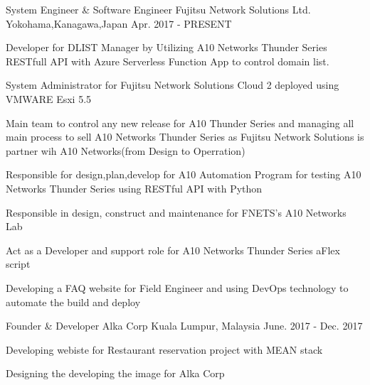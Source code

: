 

\begin{cventries}

  \cventry
	{System Engineer \& Software Engineer} %
    {Fujitsu Network Solutions Ltd. } %
    {Yokohama,Kanagawa,Japan} %
    {Apr. 2017 - PRESENT} %
    {
      \begin{cvitems} %
        \item {Developer for DLIST Manager by Utilizing A10 Networks Thunder Series RESTfull API with Azure Serverless Function App to control domain list.}
        \item {System Administrator for Fujitsu Network Solutions Cloud 2 deployed using VMWARE Esxi 5.5 }
        \item {Main team to control any new  release for A10 Thunder Series and managing all main process to sell  A10 Networks Thunder Series as Fujitsu Network Solutions is partner wih A10 Networks(from Design to Operration)}
        \item{Responsible for design,plan,develop for A10 Automation Program for testing A10 Networks Thunder Series using RESTful API with Python}
		\item{Responsible in design, construct and maintenance for FNETS's A10 Networks Lab }
		\item{Act as a Developer and support role for A10 Networks Thunder Series aFlex script }
		\item{Developing a FAQ website for Field Engineer and using DevOps technology to automate the build and deploy}
      \end{cvitems}
    }

  \cventry
	{Founder \& Developer } %
    {Alka Corp} %
    {Kuala Lumpur, Malaysia} %
    {June. 2017 - Dec. 2017} %
    {
      \begin{cvitems} %
        \item {Developing webiste for Restaurant reservation project with MEAN stack}
        \item {Designing the developing the image for Alka Corp }
      \end{cvitems}
    }


\end{cventries}
